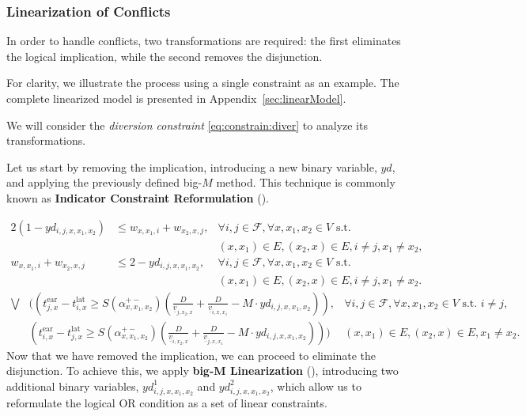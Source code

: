 \documentclass[../../thesis.tex]{subfiles}
\begin{document}
\subsubsection{Linearization of Conflicts}\label{sec:linearization:conflicts} 
In order to handle conflicts, two transformations are required: the first eliminates the logical implication, while the second removes the disjunction.

For clarity, we illustrate the process using a single constraint as an example. The complete linearized model is presented in Appendix~\ref{sec:linearModel}.  

We will consider the \textit{diversion constraint} \ref{eq:constrain:diver} to analyze its transformations.

Let us start by removing the implication, introducing a new binary variable, $yd$, and applying the previously defined big-$M$ method.  
This technique is commonly known as \textbf{Indicator Constraint Reformulation} (\cite{BALAS-19793}).

\begin{align}
    2(1-yd_{i,j,x,x_1,x_2}) &\leq w_{x,x_1,i} + w_{x_2,x,j},  
    &\forall i, j \in \mathcal{F}, \forall x, x_1, x_2 \in V\text { s.t. } 
    \nonumber\\
    && (x,x_1) \in E, (x_2,x) \in E, i \neq j, x_1 \neq x_2, \\
    w_{x,x_1,i} + w_{x_2,x,j} &\leq 2 - yd_{i,j,x,x_1,x_2},  
    &\forall i, j \in \mathcal{F}, \forall x, x_1, x_2 \in V\text { s.t. } 
    \nonumber\\
    && (x,x_1) \in E, (x_2,x) \in E, i \neq j, x_1 \neq x_2.
\end{align}
{\tiny
\begin{align}\label{eq:diverOR}
    \bigvee&
    \Bigg(\left(t^\text{ear}_{j,x}-t^\text{lat}_{i,x}\geq S(\alpha^{+-}_{x,x_1,x_2})\left(\frac{D}{\underline v_{j,x_2,x}} + \frac{D}{\underline v_{i,x,x_1}} - M \cdot yd_{i,j,x,x_1,x_2}\right)\right),
    & \forall i, j \in \mathcal{F}, \forall x,x_{1}, x_{2} \in V \text{ s.t. }i\neq j,\nonumber\\&
    \left(t^\text{ear}_{i,x}-t^\text{lat}_{j,x}\geq S(\alpha^{+-}_{x,x_1,x_2})\left(\frac{D}{\underline v_{i,x_2,x}}+\frac{D}{\underline v_{j,x,x_1}}- M \cdot yd_{i,j,x,x_1,x_2}\right)\right)\Bigg)
    &(x,x_{1}) \in E, (x_{2},x) \in E, x_1\neq x_2.
\end{align}
}
Now that we have removed the implication, we can proceed to eliminate the disjunction.  
To achieve this, we apply \textbf{big-M Linearization} (\cite{Wolsey1999}), introducing two additional binary variables, $yd^1_{i,j,x,x_1,x_2}$ and $yd^2_{i,j,x,x_1,x_2}$, which allow us to reformulate the logical OR condition as a set of linear constraints.
\end{document}
